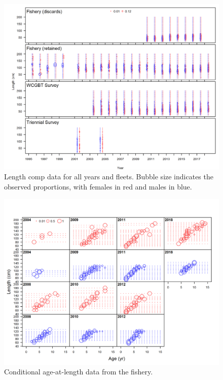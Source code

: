 \documentclass[12pt,]{article}
\begin{document}
\begin{figure}
\centering
\includegraphics{r4ss/plots_mod1/comp_lendat__multi-fleet_comparison.png}
\caption{Length comp data for all years and fleets. Bubble size
indicates the observed proportions, with females in red and males in
blue. \label{fig:comp_lendat__multi-fleet_comparison}}
\end{figure}

\begin{figure}
\centering
\includegraphics{r4ss/plots_mod1/comp_condAALdat_bubflt1mkt2.png}
\caption{Conditional age-at-length data from the fishery.
\label{fig:age_dat_fishery}}
\end{figure}
\end{document}
